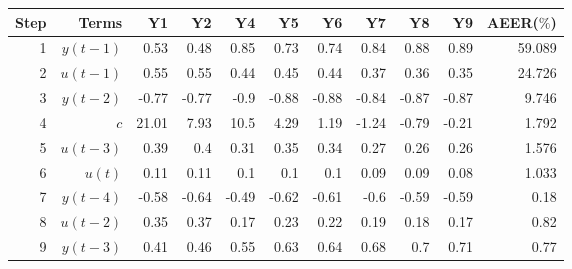 \begin{tabular}{rrrrrrrrrrr}
Step & Terms & Y1 & Y2 & Y4 & Y5 & Y6 & Y7 & Y8 & Y9 & AEER($\%$) \\ 
\hline 
1 & $y(t-1)$ & 0.53 & 0.48 & 0.85 & 0.73 & 0.74 & 0.84 & 0.88 & 0.89 & 59.089 \\ 
2 & $u(t-1)$ & 0.55 & 0.55 & 0.44 & 0.45 & 0.44 & 0.37 & 0.36 & 0.35 & 24.726 \\ 
3 & $y(t-2)$ & -0.77 & -0.77 & -0.9 & -0.88 & -0.88 & -0.84 & -0.87 & -0.87 & 9.746 \\ 
4 & $c$ & 21.01 & 7.93 & 10.5 & 4.29 & 1.19 & -1.24 & -0.79 & -0.21 & 1.792 \\ 
5 & $u(t-3)$ & 0.39 & 0.4 & 0.31 & 0.35 & 0.34 & 0.27 & 0.26 & 0.26 & 1.576 \\ 
6 & $u(t)$ & 0.11 & 0.11 & 0.1 & 0.1 & 0.1 & 0.09 & 0.09 & 0.08 & 1.033 \\ 
7 & $y(t-4)$ & -0.58 & -0.64 & -0.49 & -0.62 & -0.61 & -0.6 & -0.59 & -0.59 & 0.18 \\ 
8 & $u(t-2)$ & 0.35 & 0.37 & 0.17 & 0.23 & 0.22 & 0.19 & 0.18 & 0.17 & 0.82 \\ 
9 & $y(t-3)$ & 0.41 & 0.46 & 0.55 & 0.63 & 0.64 & 0.68 & 0.7 & 0.71 & 0.77 \\ 
\hline 
\end{tabular}